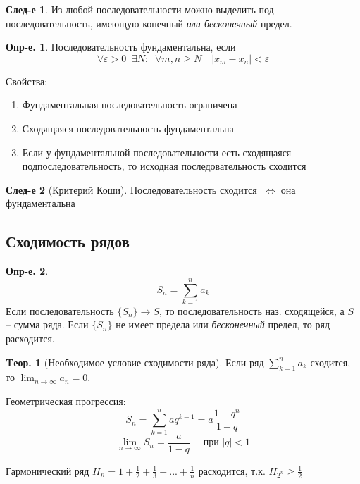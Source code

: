 \documentclass[a4paper,12pt]{article}
\numberwithin{figure}{section}
\theoremstyle{definition}
\newtheorem{definition}{Опр-е.}[section]
\newtheorem{theorem}{Tеор.}[section]
\newtheorem*{corollary}{След-е} %
\def\DS{\displaystyle}
\def\.{\;\;}
\def\eps{\varepsilon}
\def\ntoinf{n\to\infty}
\def\geqs{\geqslant}
\def\iff{$\;\Longleftrightarrow\;$}
\begin{document}
\begin{corollary}
	Из любой последовательности можно выделить под-последовательность,
	имеющую конечный \textit{или бесконечный} предел.
\end{corollary}



\begin{definition}
	Последовательность фундаментальна, если
	\[ \forall \eps>0 \. \exists N :\. \forall m,n \geqs N \quad |x_m - x_n|<\eps \]
\end{definition}


Свойства: \begin{enumerate}
	\item Фундаментальная последовательность ограничена
	\item Сходящаяся последовательность фундаментальна
	\item Если у фундаментальной последовательности есть сходящаяся
		  подпоследовательность, то исходная последовательность сходится
\end{enumerate}


\begin{corollary}[Критерий Коши]
	Последовательность сходится \iff она фундаментальна
\end{corollary}


\subsection{Сходимость рядов}

\begin{definition}
	\[ S_n = \sum_{k=1}^n a_k \]
	Если последовательность $\{S_n\} \to S$,
	то последовательность наз. сходящейся, а $S$ -- сумма ряда.
	Если $\{S_n\}$ не имеет предела или \textit{бесконечный} предел,
	то ряд расходится.
\end{definition}


\begin{theorem}[Необходимое условие сходимости ряда]
	Если ряд $\DS \sum_{k=1}^n a_k$ сходится, то $\DS \lim_{\ntoinf}a_n = 0$.
\end{theorem}

\bigskip
Геометрическая прогрессия:
	\[ S_n = \sum_{k=1}^n aq^{k-1} = a\frac{1-q^n}{1-q} \]
	\[ \lim_{\ntoinf}S_n = \frac{a}{1-q} \quad \text{ при } |q|<1 \]

Гармонический ряд $\DS H_n = 1 + \frac12 + \frac13 + ... + \frac1n$
расходится, т.к. $\DS H_{2^n} \geqs \frac12$
\end{document}
